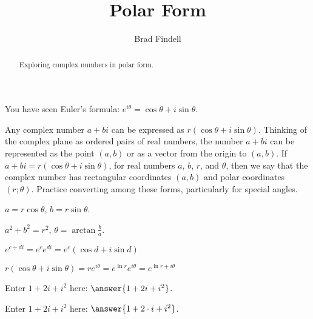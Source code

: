 \documentclass[space,nooutcomes]{ximera}
\title{Polar Form}
\author{Brad Findell}
\begin{document}
\begin{abstract}
Exploring complex numbers in polar form.   
\end{abstract}
\maketitle




You have seen Euler's formula: $e^{i\theta}=\cos\theta +i\sin\theta$.  

Any complex number $a+bi$ can be expressed as $r(\cos\theta +i\sin\theta)$.  Thinking of the complex plane as ordered pairs of real numbers, the number $a+bi$ can be represented as the point $(a,b)$ or as a vector from the origin to $(a,b)$.  If $a+bi = r(\cos\theta +i\sin\theta)$, for real numbers $a$, $b$, $r$, and $\theta$, then we say that the complex number has rectangular coordinates $(a,b)$ and polar coordinates $(r;\theta)$.  Practice converting among these forms, particularly for special angles.


\begin{problem}


$a=r\cos\theta$, $b=r\sin\theta$. 

$a^2+b^2=r^2$, $\theta = \arctan\frac{b}{a}$. 

$e^{c+di}=e^ce^{di}=e^c(\cos d +i\sin d)$

$r(\cos \theta +i\sin \theta)= re^{i\theta}=e^{\ln r}e^{i\theta}=e^{\ln r+i\theta}$

\end{problem}

\begin{problem}
Enter $1+2i+i^2$ here: $\answer{1+2i+i^2}$.

Enter $1+2i+i^2$ here: $\answer{1+2\cdot i+i^2}$.
\end{problem}
\end{document}
